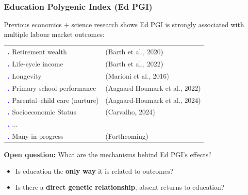 \documentclass[dvipsnames,handout]{beamer} %
\begin{document}
\begin{frame}
    \frametitle{Education Polygenic Index (Ed PGI)}
    Previous economics $+$ science research shows Ed PGI is strongly associated with multiple labour market outcomes:
    \vspace{0.25cm}

    \setcounter{rownum}{0}
    \newcommand{\rownum}{\stepcounter{rownum}
        \textbf{\textcolor{blue}{\arabic{rownum}. \;\;}} }
    \begin{tabular}{>{\rownum}l p{6cm}}
        Retirement wealth              & (Barth et al., 2020) \\
        Life-cycle income              & (Barth et al., 2022) \\
        Longevity                      & (Marioni et al., 2016) \\
        Primary school performance     & (Aagaard-Houmark et al., 2022) \\
        Parental--child care (nurture) & (Aagaard-Houmark et al., 2024) \\
        Socioeconomic Status           & (Carvalho, 2024) \\
        $\hdots$                       &  \\
        Many in-progress               & (Forthcoming)  
    \end{tabular}

    \vspace{0.5cm}
    \textbf{Open question:} What are the mechanisms behind Ed PGI's effects?
    \begin{itemize}
        \item Is education the \textbf{only way} it is related to outcomes?
        \item Is there a \textbf{direct genetic relationship}, absent returns to education? 
    \end{itemize}
\end{frame}
\end{document}
